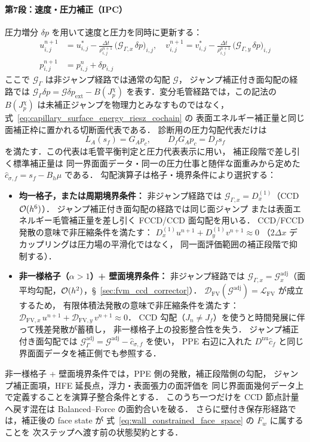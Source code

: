 \paragraph{第7段：速度・圧力補正（IPC）}
\label{box:fvm_ccd_metric}
圧力増分 $\delta p$ を用いて速度と圧力を同時に更新する：
\begin{align*}
u^{n+1}_{i,j} &= u^*_{i,j}
  - \frac{\Delta t}{\rho^{n+1}_{i,j}}\,\bigl(\mathcal{G}_{\Gamma,x}\,\delta p\bigr)_{i,j}, \quad
v^{n+1}_{i,j} = v^*_{i,j}
  - \frac{\Delta t}{\rho^{n+1}_{i,j}}\,\bigl(\mathcal{G}_{\Gamma,y}\,\delta p\bigr)_{i,j} \\
p^{n+1}_{i,j} &= p^n_{i,j} + \delta p_{i,j}
\end{align*}
ここで $\mathcal{G}_\Gamma$ は非ジャンプ経路では通常の勾配 $\mathcal{G}$，
ジャンプ補正付き面勾配の経路では
$\mathcal{G}_\Gamma\delta p=\mathcal{G}\delta p_{\mathrm{ext}}-B(J_p^\chi)$
を表す．変分毛管経路では，この記法の
$B(J_p^\chi)$ は未補正ジャンプを物理力とみなすものではなく，
式~\eqref{eq:capillary_surface_energy_riesz_cochain} の
表面エネルギー補正量と同じ面補正枠に置かれる切断面代表である．
診断用の圧力勾配代表だけは
\begin{equation}
  L_A(s_f)
  =
  G_Ap_c,\qquad
  D_fG_Ap_c=D_fs_f
  \label{eq:algorithm_range_projected_jump}
\end{equation}
を満たす．この代表は毛管平衡判定と圧力代表表示に用い，
補正段階で差し引く標準補正量は
同一界面面データ・同一の圧力仕事と随伴な面重みから定めた
$\widehat c_{\sigma,f}=s_f-B_h\mu$ である．
勾配演算子は格子・境界条件により選択する：
\begin{itemize}[noitemsep]
  \item \textbf{均一格子，または周期境界条件：}
        非ジャンプ経路では $\mathcal{G}_{\Gamma,x}=D_x^{(1)}$（CCD $\mathcal{O}(h^6)$）．
        ジャンプ補正付き面勾配の経路では同じ面ジャンプ
        または表面エネルギー毛管補正量を差し引く
        FCCD/CCD 面勾配を用いる．
        CCD/FCCD 発散の意味で非圧縮条件を満たす：
        $D_x^{(1)} u^{n+1} + D_y^{(1)} v^{n+1} \approx 0$
        （$2\Delta x$ デカップリングは圧力場の平滑化ではなく，
        同一面評価範囲の補正段階で抑制する）．
  \item \textbf{非一様格子（$\alpha>1$）+ 壁面境界条件：}
        非ジャンプ経路では $\mathcal{G}_{\Gamma,x} = \mathcal{G}_x^\text{adj}$（面平均勾配，$\mathcal{O}(h^2)$，§~\ref{sec:fvm_ccd_corrector}）．
        $\mathcal{D}_\text{FV}(\mathcal{G}^\text{adj}) = \mathcal{L}_\text{FV}$ が成立するため，
        有限体積法発散の意味で非圧縮条件を満たす：
        $\mathcal{D}_{\text{FV},x}\, u^{n+1} + \mathcal{D}_{\text{FV},y}\, v^{n+1} \approx 0$．
        CCD 勾配（$J_n \neq J_f$）を使うと時間発展に伴って残差発散が蓄積し，
        非一様格子上の投影整合性を失う．
        ジャンプ補正付き面勾配では
        $\mathcal{G}_\Gamma^\text{adj}=\mathcal{G}^\text{adj}-\widehat c_{\sigma,f}$ を使い，
        PPE 右辺に入れた $D^{\mathrm{nu}}\widehat c_f$ と同じ界面面データを補正側でも参照する．
\end{itemize}
非一様格子 + 壁面境界条件では，PPE 側の発散，補正段階側の勾配，
ジャンプ補正面項，HFE 延長点，浮力・表面張力の面評価を
同じ界面面幾何データ上で定義することを演算子整合条件とする．
このうち一つだけを CCD 節点計量へ戻す混在は Balanced--Force の面釣合いを破る．
さらに壁付き保存形経路では，補正後の face state が
式~\eqref{eq:wall_constrained_face_space} の $F_w$ に属することを
次ステップへ渡す前の状態契約とする．
